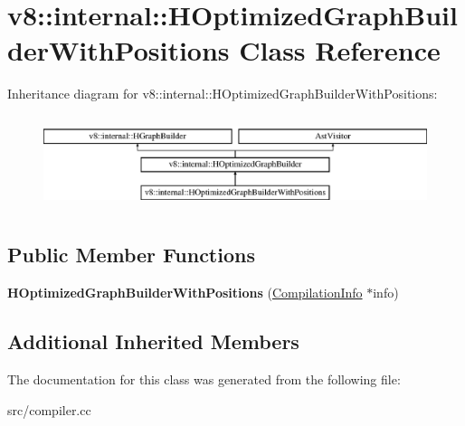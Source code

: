 \hypertarget{classv8_1_1internal_1_1_h_optimized_graph_builder_with_positions}{}\section{v8\+:\+:internal\+:\+:H\+Optimized\+Graph\+Builder\+With\+Positions Class Reference}
\label{classv8_1_1internal_1_1_h_optimized_graph_builder_with_positions}
Inheritance diagram for v8\+:\+:internal\+:\+:H\+Optimized\+Graph\+Builder\+With\+Positions\+:\begin{figure}[H]
\begin{center}
\leavevmode
\includegraphics[height=2.790698cm]{classv8_1_1internal_1_1_h_optimized_graph_builder_with_positions}
\end{center}
\end{figure}
\subsection*{Public Member Functions}
\begin{DoxyCompactItemize}
\item 
\hypertarget{classv8_1_1internal_1_1_h_optimized_graph_builder_with_positions_a60b07460a4997cc11321853e2b4bae35}{}{\bfseries H\+Optimized\+Graph\+Builder\+With\+Positions} (\hyperlink{classv8_1_1internal_1_1_compilation_info}{Compilation\+Info} $\ast$info)\label{classv8_1_1internal_1_1_h_optimized_graph_builder_with_positions_a60b07460a4997cc11321853e2b4bae35}

\end{DoxyCompactItemize}
\subsection*{Additional Inherited Members}


The documentation for this class was generated from the following file\+:\begin{DoxyCompactItemize}
\item 
src/compiler.\+cc\end{DoxyCompactItemize}
